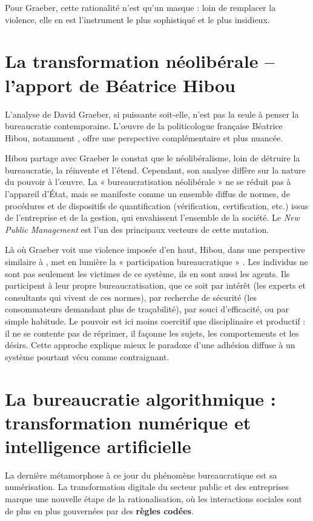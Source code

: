 Pour Graeber, cette rationalité n'est qu'un masque : loin de remplacer la violence, elle en est l'instrument le plus sophistiqué et le plus insidieux.

\section{La transformation néolibérale – l'apport de Béatrice Hibou}

L'analyse de David Graeber, si puissante soit-elle, n'est pas la seule à penser la bureaucratie contemporaine. L'œuvre de la politicologue française Béatrice Hibou, notamment \citep{Hibou2012La}, offre une perspective complémentaire et plus nuancée.

Hibou partage avec Graeber le constat que le néolibéralisme, loin de détruire la bureaucratie, la réinvente et l'étend. Cependant, son analyse diffère sur la nature du pouvoir à l'œuvre. La « bureaucratisation néolibérale »  ne se réduit pas à l'appareil d'État, mais se manifeste comme un ensemble diffus de normes, de procédures et de dispositifs de quantification (vérification, certification, etc.) issus de l'entreprise et de la gestion, qui envahissent l'ensemble de la société. Le \textit{New Public Management} est l'un des principaux vecteurs de cette mutation.

Là où Graeber voit une violence imposée d'en haut, Hibou, dans une perspective similaire à \citep{Foucault1977Surveiller}, met en lumière la « participation bureaucratique » \citet{Hibou2012La}. Les individus ne sont pas seulement les victimes de ce système, ils en sont aussi les agents. Ils participent à leur propre bureaucratisation, que ce soit par intérêt (les experts et consultants qui vivent de ces normes), par recherche de sécurité (les consommateurs demandant plus de traçabilité), par souci d'efficacité, ou par simple habitude. Le pouvoir est ici moins coercitif que disciplinaire et productif : il ne se contente pas de réprimer, il façonne les sujets, les comportements et les désirs. Cette approche explique mieux le paradoxe d'une adhésion diffuse à un système pourtant vécu comme contraignant.

\section{La bureaucratie algorithmique : transformation numérique et intelligence artificielle}

La dernière métamorphose à ce jour du phénomène bureaucratique est sa numérisation. La transformation digitale du secteur public et des entreprises marque une nouvelle étape de la rationalisation, où les interactions sociales sont de plus en plus gouvernées par des \textbf{règles codées}.

